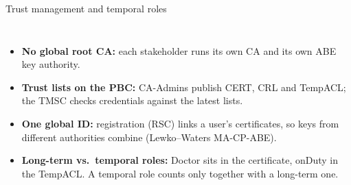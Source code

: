 \documentclass[aspectratio=169,10pt]{beamer}
\begin{document}
\begin{frame}{Trust management and temporal roles}
\begin{columns}[T,onlytextwidth]
\footnotesize
\begin{itemize}
  \item \textbf{No global root CA:} each stakeholder runs its own CA and its own ABE key authority.
  \item \textbf{Trust lists on the PBC:} CA-Admins publish CERT, CRL and TempACL; the TMSC checks credentials against the latest lists.
  \item \textbf{One global ID:} registration (RSC) links a user's certificates, so keys from different authorities combine (Lewko–Waters MA-CP-ABE).
  \item \textbf{Long-term vs.\ temporal roles:} Doctor sits in the certificate, onDuty in the TempACL. A temporal role counts only together with a long-term one.
\end{itemize}
\end{columns}
\end{frame}
\end{document}

